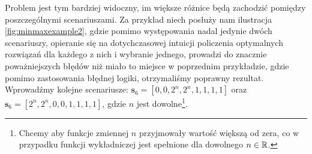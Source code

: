 Problem jest tym bardziej widoczny, im większe różnice będą zachodzić pomiędzy poszczególnymi scenariuszami. Za przykład niech posłuży nam ilustracja \ref{fig:minmaxexample2}, gdzie pomimo występowania nadal jedynie dwóch scenariuszy, opieranie się na dotychczasowej intuicji policzenia optymalnych rozwiązań dla każdego z nich i wybranie jednego, prowadzi do znacznie poważniejszych błędów niż miało to miejsce w poprzednim przykładzie, gdzie pomimo zastosowania błędnej logiki, otrzymaliśmy poprawny rezultat. Wprowadźmy kolejne scenariusze: $\textbf{s}_{6} = \left[ 0, 0, 2^{n}, 2^{n}, 1, 1, 1, 1 \right]$ oraz $\textbf{s}_{6} = \left[ 2^{n}, 2^{n}, 0, 0, 1, 1, 1, 1 \right]$, gdzie $n$ jest dowolne\footnote{Chcemy aby funkcje zmiennej $n$ przyjmowały wartość większą od zera, co w przypadku funkcji wykładniczej jest spełnione dla dowolnego $n \in \mathbb{R}$.}.


